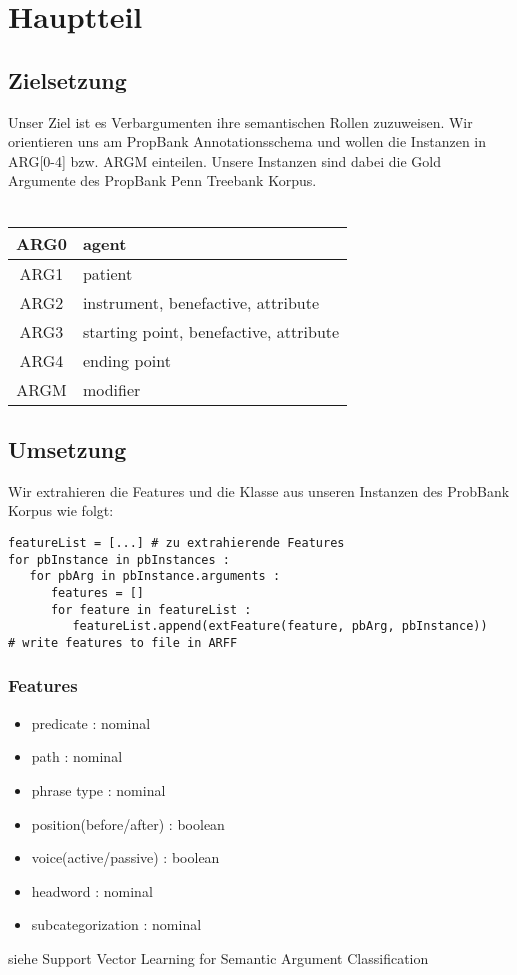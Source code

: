 \documentclass[runningheads]{llncs}
\begin{document}
\section{Hauptteil}
\subsection{Zielsetzung}

Unser Ziel ist es Verbargumenten ihre semantischen Rollen zuzuweisen. Wir orientieren uns am PropBank Annotationsschema und
wollen die Instanzen in ARG[0-4] bzw. ARGM einteilen. Unsere Instanzen sind dabei die Gold Argumente des PropBank Penn Treebank Korpus.\\
\\
\begin{table}
\centering
\begin{tabular}{|c|l|}
\hline 
ARG0 & agent \\ 
\hline 
ARG1 & patient \\ 
\hline 
ARG2 & instrument, benefactive, attribute \\ 
\hline 
ARG3 & starting point, benefactive, attribute \\ 
\hline 
ARG4 & ending point \\ 
\hline 
ARGM & modifier \\ 
\hline 
\end{tabular}
\end{table}
 
\subsection{Umsetzung}

Wir extrahieren die Features und die Klasse aus unseren Instanzen des ProbBank Korpus wie folgt:
\begin{lstlisting}[frame=lines]
featureList = [...] # zu extrahierende Features
for pbInstance in pbInstances :
   for pbArg in pbInstance.arguments :
      features = []
      for feature in featureList :
         featureList.append(extFeature(feature, pbArg, pbInstance))
# write features to file in ARFF
\end{lstlisting}

\subsubsection{Features}
\begin{itemize}
\item predicate : nominal
\item path : nominal
\item phrase type : nominal
\item position(before/after) : boolean
\item voice(active/passive) : boolean
\item headword : nominal
\item subcategorization : nominal
\end{itemize}
siehe Support Vector Learning for Semantic Argument Classiﬁcation\cite{svm}
\end{document}
